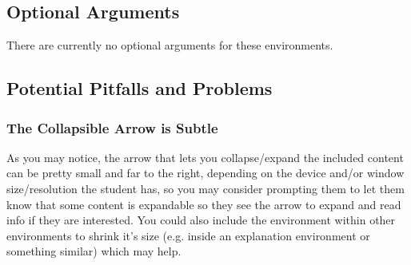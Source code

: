 \documentclass{ximera}
\begin{document}
\subsection*{Optional Arguments}
    There are currently no optional arguments for these environments.

\subsection*{Potential Pitfalls and Problems}

    \subsubsection*{The Collapsible Arrow is Subtle}
        As you may notice, the arrow that lets you collapse/expand the included content can be pretty small and far to the right, depending on the device and/or window size/resolution the student has, so you may consider prompting them to let them know that some content is expandable so they see the arrow to expand and read info if they are interested. You could also include the environment within other environments to shrink it's size (e.g. inside an explanation environment or something similar) which may help.
\end{document}
